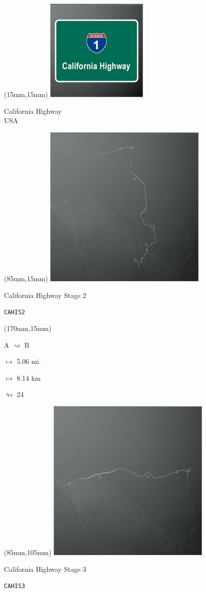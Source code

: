 \begin{textblock*}{60mm}(15mm,15mm)%
\includegraphics[width=50mm]{LG/2015-05-20_00077.png}
\par California Highway\\ USA
\end{textblock*}
\begin{textblock*}{80mm}(85mm,15mm)%
\includegraphics[width=80mm]{TR/2015-05-20_00015.png}
\centerline{California Highway Stage 2}
\par\hfill\tiny\tt CAHIS2\\
\end{textblock*}
\begin{textblock*}{30mm}(170mm,15mm)%
\par A $\rightsquigarrow$ B
\Large
\par$\mapsto$ 5.06 mi.
\par$\mapsto$ 8.14 km
\par$\looparrowright$ 24
\end{textblock*}
\begin{textblock*}{80mm}(85mm,105mm)%
\includegraphics[width=80mm]{TR/2015-05-20_00016.png}
\centerline{California Highway Stage 3}
\par\hfill\tiny\tt CAHIS3\\
\end{textblock*}
